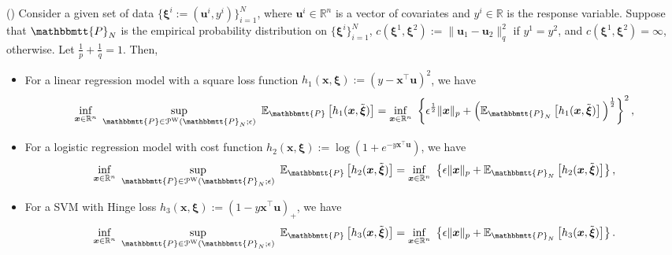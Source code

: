 \documentclass[final,onefignum,onetabnum]{class}
\newcommand{\ee}[2]{\mathbb{E}_{#1} \left[ #2 \right]}
\newcommand{\bs}[1]{\boldsymbol{#1}} %
\newcommand{\Bs}[1]{\mathbb{#1}} %
\newcommand{\Ts}[1]{\mathbbmtt{#1}} %
\newcommand{\Cs}[1]{\mathcal{#1}} %
\newcommand{\txi}{\tilde{\bs{\xi}}}
\begin{document}
\begin{theorem}{(\citet[Theorem~2--3]{blanchet2016robust})}
    \label{thm: rev.lin_reg_square_loss_reg_reg}
    Consider a given set of data \linebreak $\{\bs{\xi}^{i}:=(\bs{u}^{i},y^{i})\}_{i=1}^{N}$, where $\bs{u}^{i} \in \Bs{R}^{n}$ is a vector of covariates and $y^{i} \in \Bs{R}$ is the response variable.  Suppose that $\Ts{P}_{N}$ is the empirical probability distribution on $\{\bs{\xi}^{i}\}_{i=1}^{N}$,  $c(\bs{\xi}^{1},\bs{\xi}^{2}):=\| \bs{u}_{1} - \bs{u}_{2} \|_{q}^{2}$ if $y^{1}=y^{2}$, and  $c(\bs{\xi}^{1},\bs{\xi}^{2})=\infty$, otherwise. Let $\frac{1}{p}+\frac{1}{q}=1$. 
    Then, 
    \begin{itemize}
    \item  For a linear regression model with a square loss function $h_{1}(\bs{x}, \bs{\xi}):=(y-\bs{x}^{\top}\bs{u})^{2}$, we have 
    $$\inf_{\bs{x} \in \Bs{R}^{n} } \ \sup_{\Ts{P} \in \Cs{P}^{\text{W}}(\Ts{P}_{N}; \epsilon) } \ 	\ee{\Ts{P}}{h_{1}(\bs{x},\txi)} = \inf_{\bs{x} \in \Bs{R}^{n}}  \ \left\lbrace  \epsilon^{\frac{1}{2}} \| \bs{x} \|_{p} + \Big( \ee{\Ts{P}_{N}}{h_{1}(\bs{x},\txi)} \Big)^{\frac{1}{2}} \right\rbrace^{2},$$
    
    \item For a logistic regression model with cost function $h_{2}(\bs{x}, \bs{\xi}):=\log(1+e^{-y\bs{x}^{\top}\bs{u} })$, we have $$\inf_{\bs{x} \in \Bs{R}^{n} } \ \sup_{\Ts{P} \in \Cs{P}^{\text{W}}(\Ts{P}_{N}; \epsilon) } \ 	\ee{\Ts{P}}{h_{2}(\bs{x},\txi)} = \inf_{\bs{x} \in \Bs{R}^{n}}  \ \left\lbrace  \epsilon \| \bs{x} \|_{p} +  \ee{\Ts{P}_{N}}{h_{2}(\bs{x},\txi)}  \right\rbrace,$$
    
    \item For a SVM with Hinge loss $h_{3}(\bs{x}, \bs{\xi}):=(1-y\bs{x}^{\top}\bs{u})_{+} $, we have 
     $$\inf_{\bs{x} \in \Bs{R}^{n} } \ \sup_{\Ts{P} \in \Cs{P}^{\text{W}}(\Ts{P}_{N}; \epsilon) } \ 	\ee{\Ts{P}}{h_{3}(\bs{x},\txi)} = \inf_{\bs{x} \in \Bs{R}^{n}}  \ \left\lbrace  \epsilon \| \bs{x} \|_{p} +  \ee{\Ts{P}_{N}}{h_{3}(\bs{x},\txi)}  \right\rbrace.$$
    \end{itemize}
\end{theorem}
\end{document}
